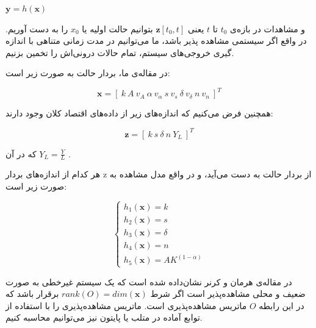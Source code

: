 \documentclass[11pt, fleqn]{article}
\begin{document}
\begin{multicols}{2}
\begin{latin}
$\mathbf{y} = h(\mathbf{x})$
\end{latin}

و مشاهدات در بازه‌ی 
$t_0$
 تا 
 $t$
  یعنی
$\mathbf{z}[t_0, t]$
 بتوانیم حالت اولیه یا 
 $x_0$
 را به دست آوریم. در واقع اگر سیستمی مشاهده‌ پذیر باشد، ما می‌توانیم در مدت زمانی متناهی با اندازه گیری خروجی‌های سیستم، تمام حالات درونی‌اش را تخمین بزنیم.  
 
	در مقاله‌ی ما، بردار حالت به صورت زیر است:

\useshortskip
\begin{LTR}
\begin{equation}
\mathbf{x} = [\ k \ A \ v_A \  \alpha \  v_\alpha \  s \ v_s  \ \delta \  v_\delta \ n \  v_n \ ]^T
\end{equation} 
\end{LTR}

همچنین فرض می‌کنیم که اندازه‌های زیر از داده‌های اقتصاد کلان وجود دارند:

\useshortskip
\begin{LTR}
\begin{equation}
\mathbf{z} = [\ k \ s \ \delta \ n \ Y_L \ ]^T
\end{equation}
\end{LTR}


که در آن 
 $Y_L = \frac{Y}{L}$
  . 

	هر کدام از اندازه‌های بردار z از بردار حالت به دست می‌آید، و در واقع مدل مشاهده به صورت زیر است:

\useshortskip
\begin{LTR}
\begin{equation}
\begin{cases}
h_1(\mathbf{x}) = k \\
 h_2(\mathbf{x}) = s \\
  h_3(\mathbf{x}) = \delta \\
   h_4(\mathbf{x}) = n \\
    h_5(\mathbf{x}) = AK^{(1-\alpha)} \end{cases}
\end{equation}
\end{LTR}


	در مقاله‌ی هرمان و کرنر 
نشان‌داده شده است که یک سیستم غیرخطی به صورت ضعیف و محلی مشاهده‌پذیر
 است اگر شرط
$rank(O) = dim(\mathbf{x})$
برقرار باشد که در این رابطه
$O$
 ماتریس مشاهده‌پذیری
 است. ماتریس مشاهده‌پذیری را با استفاده از توابع آماده در متلب یا پایتون نیز می‌توانیم محاسبه کنیم.
 

\end{multicols}
\end{document}
